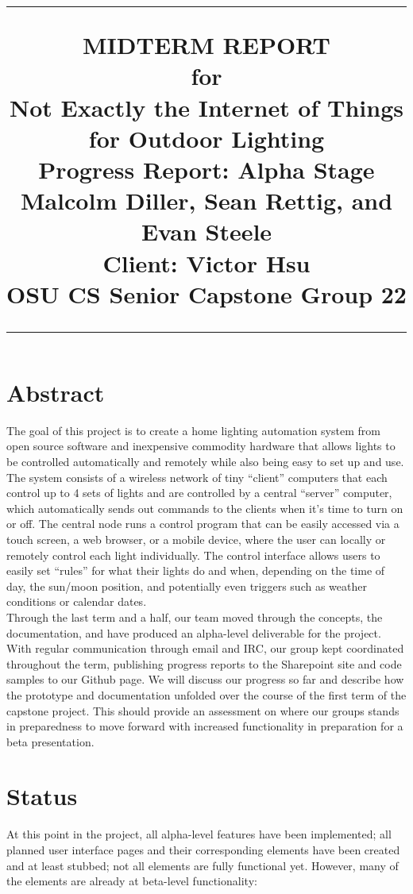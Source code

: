 \documentclass[oneside,openright]{book}
\title{
	\flushright
		\rule{16cm}{5pt}\vskip1cm
		\Huge{MIDTERM REPORT}\\
	for\\
		\vspace{2cm}
	Not Exactly the Internet of Things for Outdoor Lighting\\
		\vspace{2cm}
	\LARGE{Progress Report:}
	\vspace{2cm}
	\LARGE{Alpha Stage\\}
	\vspace{2cm}
	Malcolm Diller, Sean Rettig, and Evan Steele\\
        Client: Victor Hsu\\
        OSU CS Senior Capstone Group 22
		\vfill
		\rule{16cm}{5pt}
}
\date{}
\begin{document}
\maketitle
\tableofcontents
\newpage
{}
\section{Abstract}

The goal of this project is to create a home lighting automation system from
open source software and inexpensive commodity hardware that allows lights to
be controlled automatically and remotely while also being easy to set up and
use.\\

The system consists of a wireless network of tiny ``client'' computers that
each control up to 4 sets of lights and are controlled by a central ``server''
computer, which automatically sends out commands to the clients when it's
time to turn on or off.  The central node runs a control program that can
be easily accessed via a touch screen, a web browser, or a mobile device, where
the user can locally or remotely control each light individually. The control
interface allows users to easily set ``rules'' for what their lights do and
when, depending on the time of day, the sun/moon position, and potentially even
triggers such as weather conditions or calendar dates.\\

Through the last term and a half, our team moved through the concepts, the
documentation, and have produced an alpha-level deliverable for the project.
With regular communication through email and IRC, our group kept coordinated
throughout the term, publishing progress reports to the Sharepoint site and
code samples to our Github page. We will discuss our progress so far and
describe how the prototype and documentation unfolded over the course of the
first term of the capstone project. This should provide an assessment on where
our groups stands in preparedness to move forward with increased functionality
in preparation for a beta presentation.

\pagebreak

\section{Status}

At this point in the project, all alpha-level features have been implemented;
all planned user interface pages and their corresponding elements have been
created and at least stubbed; not all elements are fully functional yet.
However, many of the elements are already at beta-level functionality:
\end{document}
